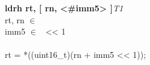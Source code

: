 


\begin{instructionblock}{\imagewidth}%
    \textbf{ldrh rt, [ rn, <\#imm5> ]}\hfill\textit{T1}\\
    rt, rn $\in$ \baseregisters\\
    imm5 $\in$ \immFive\ {<}{<} 1\\
    \\
    rt = *((uint16\_t)(rn + imm5 {<}{<} 1));
\end{instructionblock}


